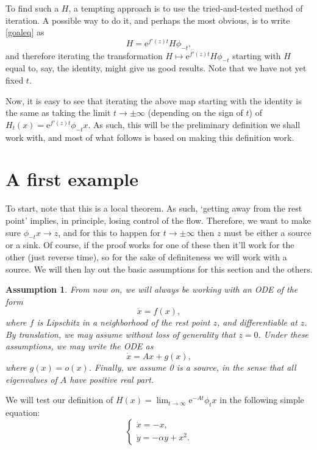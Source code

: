 \documentclass{article}
\newcommand{\e}{\mathrm{e}}
\newtheorem*{Assumption}{Assumption}
\begin{document}
To find such a $H$, a tempting approach is to use the tried-and-tested method of iteration. A possible way to do it, and perhaps the most obvious, is to write \eqref{goaleq} as
\begin{equation}
H = \e^{f'(z) t} H \phi_{-t},
\end{equation}
and therefore iterating the transformation $H \mapsto \e^{f'(z) t} H \phi_{-t}$ starting with $H$ equal to, say, the identity, might give us good results. Note that we have not yet fixed $t$.

Now, it is easy to see that iterating the above map starting with the identity is the same as taking the limit $t \to \pm\infty$ (depending on the sign of $t$) of $H_t(x) = \e^{f'(z) t} \phi_{-t} x$. As such, this will be the preliminary definition we shall work with, and most of what follows is based on making this definition work.

\section{A first example}

To start, note that this is a local theorem. As such, `getting away from the rest point' implies, in principle, losing control of the flow. Therefore, we want to make sure $\phi_{-t} x \to z$, and for this to happen for $t \to \pm \infty$ then $z$ must be either a source or a sink. Of course, if the proof works for one of these then it'll work for the other (just reverse time), so for the sake of definiteness we will work with a source. We will then lay out the basic assumptions for this section and the others.

\begin{Assumption}
From now on, we will always be working with an ODE of the form
\[\dot x = f(x),\]
where $f$ is Lipschitz in a neighborhood of the rest point $z$, and differentiable at $z$. By translation, we may assume without loss of generality that $z = 0$. Under these assumptions, we may write the ODE as
\[\dot x = A x + g(x),\]
where $g(x) = o(x)$. Finally, we assume 0 is a source, in the sense that all eigenvalues of $A$ have positive real part.
\end{Assumption}

We will test our definition of $H(x) = \lim_{t \to \infty} \e^{-A t} \phi_t x$ in the following simple equation:
\[
\begin{cases}
\dot x = -x,\\
\dot y = -\alpha y + x^2.
\end{cases}
\]
\end{document}

